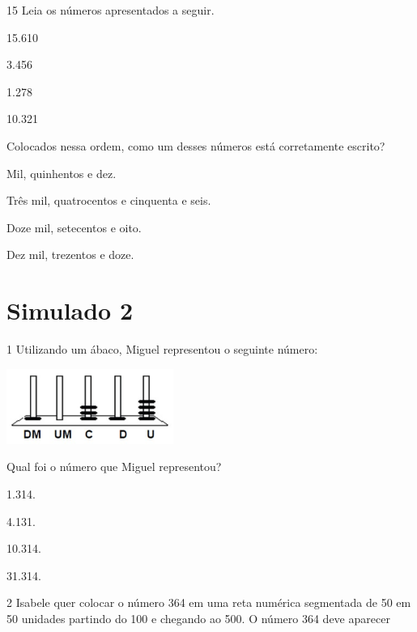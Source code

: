 \begin{mdframed}[linewidth=2pt,linecolor=salmao,roundcorner=2pt]
\begin{escolha}
{\begin{escolha}
\num{15} Leia os números apresentados a seguir.

\begin{center}
\begin{mdframed}[linewidth=2pt,linecolor=azul!20,backgroundcolor=azul!20,roundcorner=2pt]
15.610

3.456

1.278

10.321
\end{mdframed}
\end{center}

Colocados nessa ordem, como um desses números está corretamente escrito?

\begin{escolha}
\item Mil, quinhentos e dez.

\item Três mil, quatrocentos e cinquenta e seis.

\item Doze mil, setecentos e oito.

\item Dez mil, trezentos e doze.
\end{escolha}


\chapter{Simulado 2}

\num{1} Utilizando um ábaco, Miguel representou o seguinte número:

\includegraphics[width=2.14744in,height=0.97003in]{media/image152.png}


Qual foi o número que Miguel representou?

\begin{escolha}
\item
  1.314.
\item
  4.131.
\item
  10.314.
\item
  31.314.
\end{escolha}

\num{2} Isabele quer colocar o número 364 em uma reta numérica segmentada de 50 em 50 unidades partindo do 100 e chegando ao 500. O número 364 deve aparecer


\end{escolha}}
\end{escolha}
\end{mdframed}
